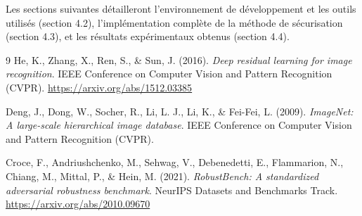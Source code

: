 Les sections suivantes détailleront l'environnement de développement et les outils utilisés (section 4.2), l'implémentation complète de la méthode de sécurisation (section 4.3), et les résultats expérimentaux obtenus (section 4.4).

\begin{thebibliography}{9}
He, K., Zhang, X., Ren, S., \& Sun, J. (2016).
\textit{Deep residual learning for image recognition}.
IEEE Conference on Computer Vision and Pattern Recognition (CVPR).
\url{https://arxiv.org/abs/1512.03385}

Deng, J., Dong, W., Socher, R., Li, L. J., Li, K., \& Fei-Fei, L. (2009).
\textit{ImageNet: A large-scale hierarchical image database}.
IEEE Conference on Computer Vision and Pattern Recognition (CVPR).

Croce, F., Andriushchenko, M., Sehwag, V., Debenedetti, E., Flammarion, N., Chiang, M., Mittal, P., \& Hein, M. (2021).
\textit{RobustBench: A standardized adversarial robustness benchmark}.
NeurIPS Datasets and Benchmarks Track.
\url{https://arxiv.org/abs/2010.09670}
\end{thebibliography}
